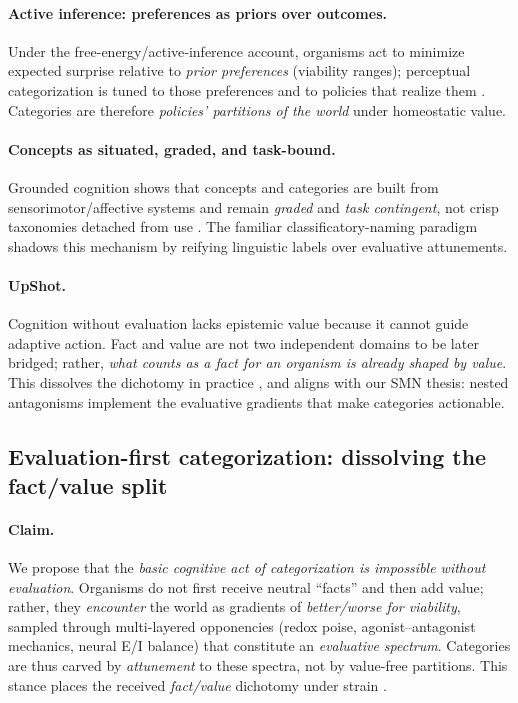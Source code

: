 \paragraph{Active inference: preferences as priors over outcomes.}
Under the free-energy/active‐inference account, organisms act to minimize expected surprise relative to \emph{prior preferences} (viability ranges); perceptual categorization is tuned to those preferences and to policies that realize them \citep{Friston2010_FreeEnergy}. Categories are therefore \emph{policies’ partitions of the world} under homeostatic value.

\paragraph{Concepts as situated, graded, and task-bound.}
Grounded cognition shows that concepts and categories are built from sensorimotor/affective systems and remain \emph{graded} and \emph{task contingent}, not crisp taxonomies detached from use \citep{Barsalou2008_Grounded}. The familiar classificatory-naming paradigm shadows this mechanism by reifying linguistic labels over evaluative attunements.

\paragraph{UpShot.}
Cognition without evaluation lacks epistemic value because it cannot guide adaptive action. Fact and value are not two independent domains to be later bridged; rather, \emph{what counts as a fact for an organism is already shaped by value}. This dissolves the dichotomy in practice \citep{Putnam2002_Collapse}, and aligns with our SMN thesis: nested antagonisms implement the evaluative gradients that make categories actionable.


\subsection{Evaluation-first categorization: dissolving the fact/value split}
\label{subsec:evaluation_first}

\paragraph{Claim.}
We propose that the \emph{basic cognitive act of categorization is impossible without evaluation}. Organisms do not first receive neutral “facts” and then add value; rather, they \emph{encounter} the world as gradients of \emph{better/worse for viability}, sampled through multi-layered opponencies (redox poise, agonist--antagonist mechanics, neural E/I balance) that constitute an \emph{evaluative spectrum}. Categories are thus carved by \emph{attunement} to these spectra, not by value-free partitions. This stance places the received \emph{fact/value} dichotomy under strain \citep{Putnam2002_FactValue,Dewey1939_TheoryValuation}.

